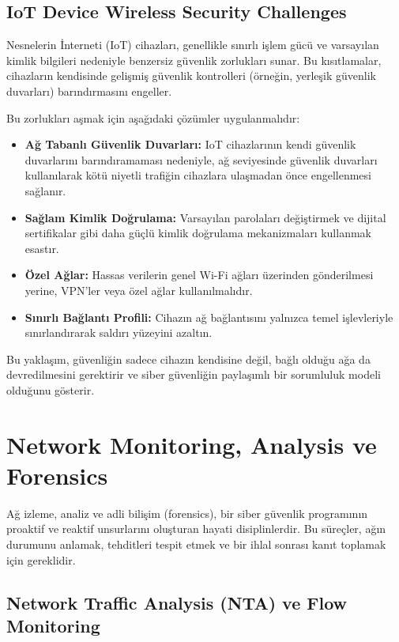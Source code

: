 \subsection{IoT Device Wireless Security Challenges}

Nesnelerin İnterneti (IoT) cihazları, genellikle sınırlı işlem gücü ve varsayılan kimlik bilgileri nedeniyle benzersiz güvenlik zorlukları sunar. Bu kısıtlamalar, cihazların kendisinde gelişmiş güvenlik kontrolleri (örneğin, yerleşik güvenlik duvarları) barındırmasını engeller.

Bu zorlukları aşmak için aşağıdaki çözümler uygulanmalıdır:

\begin{itemize}
\item \textbf{Ağ Tabanlı Güvenlik Duvarları:} IoT cihazlarının kendi güvenlik duvarlarını barındıramaması nedeniyle, ağ seviyesinde güvenlik duvarları kullanılarak kötü niyetli trafiğin cihazlara ulaşmadan önce engellenmesi sağlanır.
\item \textbf{Sağlam Kimlik Doğrulama:} Varsayılan parolaları değiştirmek ve dijital sertifikalar gibi daha güçlü kimlik doğrulama mekanizmaları kullanmak esastır.
\item \textbf{Özel Ağlar:} Hassas verilerin genel Wi-Fi ağları üzerinden gönderilmesi yerine, VPN'ler veya özel ağlar kullanılmalıdır.
\item \textbf{Sınırlı Bağlantı Profili:} Cihazın ağ bağlantısını yalnızca temel işlevleriyle sınırlandırarak saldırı yüzeyini azaltın.
\end{itemize}

Bu yaklaşım, güvenliğin sadece cihazın kendisine değil, bağlı olduğu ağa da devredilmesini gerektirir ve siber güvenliğin paylaşımlı bir sorumluluk modeli olduğunu gösterir.

\section{Network Monitoring, Analysis ve Forensics}

Ağ izleme, analiz ve adli bilişim (forensics), bir siber güvenlik programının proaktif ve reaktif unsurlarını oluşturan hayati disiplinlerdir. Bu süreçler, ağın durumunu anlamak, tehditleri tespit etmek ve bir ihlal sonrası kanıt toplamak için gereklidir.

\subsection{Network Traffic Analysis (NTA) ve Flow Monitoring}

